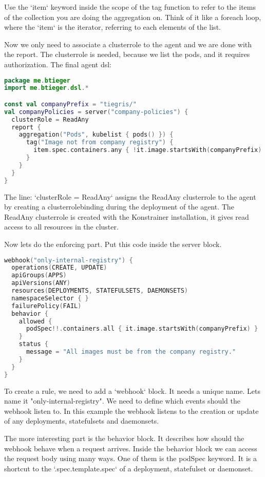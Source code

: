 Use the `item` keyword inside the scope of the tag function to refer to the items of the collection you are doing the aggregation on. Think of it like a foreach loop, where the `item` is the iterator, referring to each elements of the list.

Now we only need to associate a clusterrole to the agent and we are done with the report. The clusterrole is needed, because we list the pods, and it requires authorization. The final agent dsl:

\begin{lstlisting}[caption={TODO},language=Kotlin,label=code:todo]
package me.btieger
import me.btieger.dsl.*

const val companyPrefix = "tiegris/"
val companyPolicies = server("company-policies") {
  clusterRole = ReadAny
  report {
    aggregation("Pods", kubelist { pods() }) {
      tag("Image not from company registry") {
        item.spec.containers.any { !it.image.startsWith(companyPrefix) }
      }
    }
  }
}
\end{lstlisting}

The line: `clusterRole = ReadAny` assigns the ReadAny clusterrole to the agent by creating a clusterrolebinding during the deployment of the agent. The ReadAny clusterrole is created with the Konstrainer installation, it gives read access to all resources in the cluster.

Now lets do the enforcing part. Put this code inside the server block.

\begin{lstlisting}[caption={TODO},language=Kotlin,label=code:todo]
webhook("only-internal-registry") {
  operations(CREATE, UPDATE)
  apiGroups(APPS)
  apiVersions(ANY)
  resources(DEPLOYMENTS, STATEFULSETS, DAEMONSETS)
  namespaceSelector { }
  failurePolicy(FAIL)
  behavior {
    allowed {
      podSpec!!.containers.all { it.image.startsWith(companyPrefix) }
    }
    status {
      message = "All images must be from the company registry."
    }
  }
}
\end{lstlisting}

To create a rule, we need to add a `webhook` block. It needs a unique name. Lets name it "only-internal-registry". We need to define which events should the webhook listen to. In this example the webhook listens to the creation or update of any deployments, statefulsets and daemonsets.

The more interesting part is the behavior block. It describes how should the webhook behave when a request arrives. Inside the behavior block we can access the request body using many ways. One of them is the podSpec keyword. It is a shortcut to the `.spec.template.spec` of a deployment, statefulset or daemonset.

